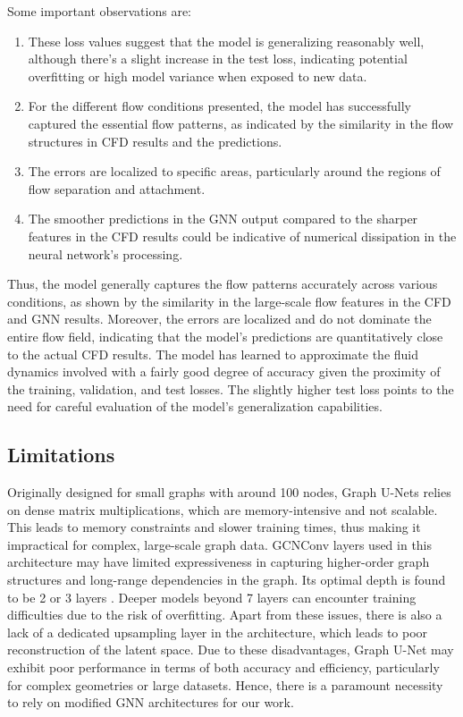 Some important observations are: 
\begin{enumerate}
    \item  These loss values suggest that the model is generalizing reasonably well, although there's a slight increase in the test loss, indicating potential overfitting or high model variance when exposed to new data.
    \item For the different flow conditions presented, the model has successfully captured the essential flow patterns, as indicated by the similarity in the flow structures in CFD results and the predictions.
    \item The errors are localized to specific areas, particularly around the regions of flow separation and attachment.
    \item The smoother predictions in the GNN output compared to the sharper features in the CFD results could be indicative of numerical dissipation in the neural network’s processing.
\end{enumerate}
Thus, the model generally captures the flow patterns accurately across various conditions, as shown by the similarity in the large-scale flow features in the CFD and GNN results. Moreover, the errors are localized and do not dominate the entire flow field, indicating that the model's predictions are quantitatively close to the actual CFD results. The model has learned to approximate the fluid dynamics involved with a fairly good degree of accuracy given the proximity of the training, validation, and test losses. The slightly higher test loss points to the need for careful evaluation of the model's generalization capabilities. 
\subsection{Limitations}
Originally designed for small graphs with around 100 nodes, Graph U-Nets relies on dense matrix multiplications, which are memory-intensive and not scalable. This leads to memory constraints and slower training times, thus making it impractical for complex, large-scale graph data. GCNConv layers used in this architecture may have limited expressiveness in capturing higher-order graph structures and long-range dependencies in the graph. Its optimal depth is found to be 2 or 3 layers \cite{kipf}. Deeper models beyond 7 layers can encounter training difficulties due to the risk of overfitting. Apart from these issues, there is also a lack of a dedicated upsampling layer in the architecture, which leads to poor reconstruction of the latent space. Due to these disadvantages, Graph U-Net may exhibit poor performance in terms of both accuracy and efficiency, particularly for complex geometries or large datasets. Hence, there is a paramount necessity to rely on modified GNN architectures for our work.
